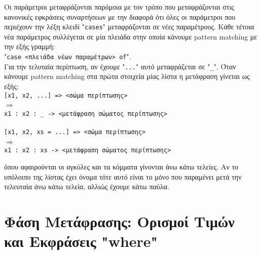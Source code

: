 \documentclass[diploma]{softlab-thesis}
\def\lra{$\Longrightarrow$\ }
\begin{document}
\begin{itemize}
Οι παράμετροι μεταφράζονται παρόμοια με τον τρόπο που μεταφράζονται στις
κανονικές εφκράσεις συναρτήσεων με την διαφορά ότι όλες οι παράμετροι που
περιέχουν την λέξη κλειδί "\texttt{cases}" μεταφράζονται σε νέες παραμέτρους.
Κάθε τέτοια νέα παράμετρος συλλέγεται σε μία πλειάδα στην οποία κάνουμε
pattern matching με την εξής γραμμή:
\\"\verb|case <πλειάδα νέων παραμέτρων> of|". \\
Για την τελυταία περίπτωση, αν έχουμε "\verb|...|" αυτό μεταφράζεται σε
"\verb|_|". Όταν κάνουμε pattern matching στα πρώτα στοιχεία μίας λίστα η
μετάφραση γίνεται ως εξής:
\\
\verb|[x1, x2, ...] => <σώμα περίπτωσης>|
\\
\lra
\\
\verb|x1 : x2 : _ -> <μετάφραση σώματος περίπτωσης>|
\\\\
\verb|[x1, x2, xs = ...] => <σώμα περίπτωσης>|
\\
\lra
\\
\verb|x1 : x2 : xs -> <μετάφραση σώματος περίπτωσης>|

όπου αφαιρούνται οι αγκύλες και τα κόμματα γίνονται άνω κάτω τελείες.
Αν το υπόλοιπο της λίστας έχει όνομα τότε αυτό είναι το μόνο που παραμένει
μετά την τελευταία άνω κάτω τελεία, αλλιώς έχουμε κάτω παύλα.
\end{itemize}

\newpage

\section{Φάση Μετάφρασης: Ορισμοί Τιμών και Εκφράσεις "where"}
\end{document}
